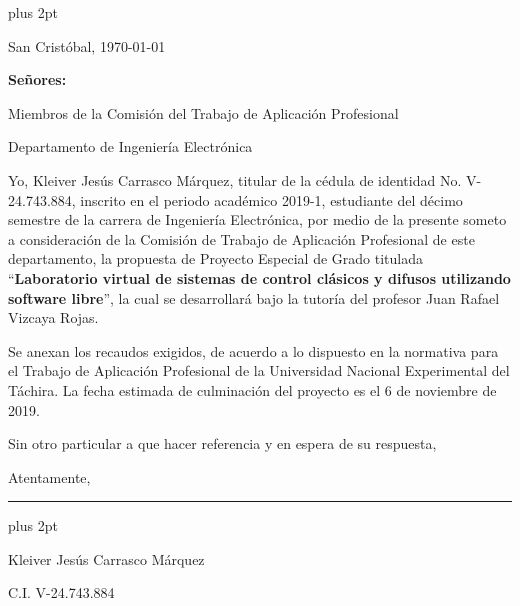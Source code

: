 % 

\begin{titlepage}
\parskip=7.25pt plus 2pt
\setcounter{page}{2}
\begin{flushright}
	San Cristóbal, \today
\end{flushright}

\vspace{1cm}
\vfill

\begin{flushleft}
		\singlespacing
		\setlength{\parskip}{0pt}
		
		\textbf{Señores:}
		
		Miembros de la Comisión del Trabajo de Aplicación Profesional
		
		Departamento de Ingeniería Electrónica
		
\end{flushleft}

\vfill
\begin{spacing}{1.5}
	Yo, Kleiver Jesús Carrasco Márquez, titular de la cédula de identidad No. \mbox{V-24.743.884}, inscrito en el periodo académico 2019-1, estudiante del décimo semestre de la carrera de Ingeniería Electrónica, por medio de la presente someto a consideración de la Comisión de Trabajo de Aplicación Profesional de este departamento, la propuesta de Proyecto Especial de Grado titulada \enquote{\textbf{Laboratorio virtual de sistemas de control clásicos y difusos utilizando software libre}}, la cual se desarrollará bajo la tutoría del profesor Juan Rafael Vizcaya Rojas.
	
	Se anexan los recaudos exigidos, de acuerdo a lo dispuesto en la normativa para el Trabajo de Aplicación Profesional de la Universidad Nacional Experimental del Táchira. La fecha estimada de culminación del proyecto es el 6 de noviembre de 2019.
	
	Sin otro particular a que hacer referencia y en espera de su respuesta,
	
	\setlength{\parskip}{20pt} 
	
	\noindent Atentamente,
\end{spacing}

\vfill

\begin{center}
	
	\rule{6cm}{1pt}
	
	\vspace{0.2cm}
	
	\parskip=0pt plus 2pt
    
    \begin{spacing}{1}    
        Kleiver Jesús Carrasco Márquez
    
        C.I. V-24.743.884
    \end{spacing}
\end{center}

\vspace{0.5cm}

\end{titlepage}